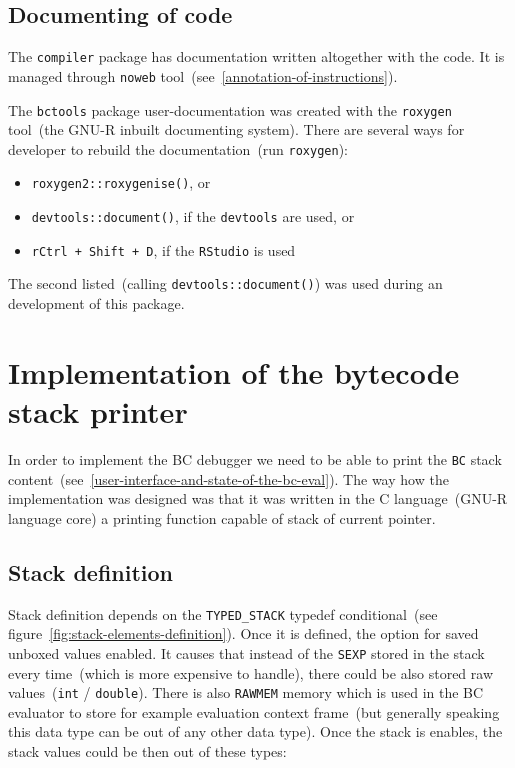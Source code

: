 \documentclass[thesis=M,english]{FITthesis}[2018/10/20]
\newcommand{\code}[1]{\texttt{#1}}
\begin{document}

\subsection{Documenting of code}

The \code{compiler} package has documentation written altogether with the code. It is managed through \code{noweb} tool~(see~\ref{annotation-of-instructions}).

The \code{bctools} package user-documentation was created with the \code{roxygen} tool~(the GNU-R inbuilt documenting system). There are several ways for developer to rebuild the documentation~(run \code{roxygen}):
\begin{itemize}
 \item \code{roxygen2::roxygenise()}, or
 \item \code{devtools::document()}, if the \code{devtools} are used, or
 \item \code{rCtrl + Shift + D}, if the \code{RStudio} is used
\end{itemize}

The second listed~(calling \code{devtools::document()}) was used during an development of this package.

\section{Implementation of the bytecode stack printer}\label{implementation-of-stack-printer}

In order to implement the BC debugger we need to be able to print the \code{BC} stack content~(see~\ref{user-interface-and-state-of-the-bc-eval}). The way how the implementation was designed was that it was written in the C language~(GNU-R language core) a printing function capable of stack of current pointer.

\subsection{Stack definition}

Stack definition depends on the \code{TYPED{\_}STACK} typedef conditional~(see figure~\ref{fig:stack-elements-definition}). Once it is defined, the option for saved unboxed values enabled. It causes that instead of the \code{SEXP} stored in the stack every time~(which is more expensive to handle), there could be also stored raw values~(\code{int} / \code{double}). There is also \code{RAWMEM} memory which is used in the BC evaluator to store for example evaluation context frame~(but generally speaking this data type can be out of any other data type). Once the stack is enables, the stack values could be then out of these types:
\end{document}
